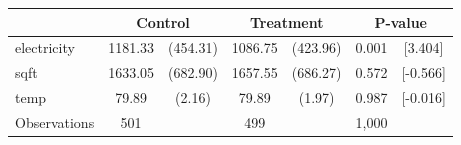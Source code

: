 {
\def\sym#1{\ifmmode^{#1}\else\(^{#1}\)\fi}
\begin{tabular}{l*{3}{cc}}
\hline\hline
            &\multicolumn{2}{c}{Control}&\multicolumn{2}{c}{Treatment}&\multicolumn{2}{c}{P-value}\\
\hline
electricity &    1181.33 &   (454.31) &    1086.75 &   (423.96) &       0.001&     [3.404]\\
sqft        &    1633.05 &   (682.90) &    1657.55 &   (686.27) &       0.572&    [-0.566]\\
temp        &      79.89 &     (2.16) &      79.89 &     (1.97) &       0.987&    [-0.016]\\
\hline
Observations&         501&            &         499&            &       1,000&            \\
\hline\hline
\end{tabular}
}
